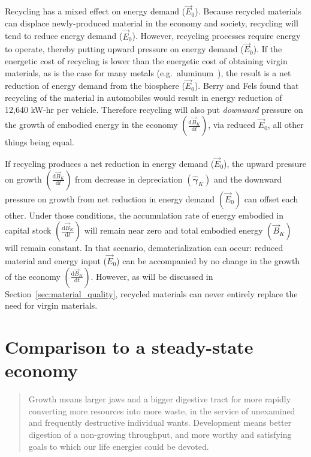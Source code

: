 Recycling has a mixed effect on energy demand ($\vec{E}_{0}$). 
Because recycled materials can displace newly-produced material 
in the economy and society, 
recycling will tend to reduce energy demand ($\vec{E}_{0}$). 
However, recycling processes require energy to operate, 
thereby putting upward pressure on energy demand ($\vec{E}_{0}$). 
If the energetic cost of recycling is lower than 
the energetic cost of obtaining virgin materials, 
as is the case for many metals
(e.g.\ aluminum~\cite{Chapman1975}), 
the result is a net reduction of energy demand 
from the biosphere ($\vec{E}_{0}$). 
Berry and Fels found that recycling of the material in automobiles
would result in energy reduction of 12,640 kW-hr per vehicle.\cite[p.~15]{Berry:1973vo}
Therefore recycling will also put \emph{downward} pressure on 
the growth of embodied energy in the economy
$\left(\frac{\mathrm{d}\vec{B}_{K}}{\mathrm{d}t}\right)$,
via reduced $\vec{E}_{0}$, all other things being equal. 

If recycling produces a net reduction in energy demand ($\vec{E}_{0}$), 
the upward pressure on growth 
$\left(\frac{\mathrm{d}\vec{B}_{K}}{\mathrm{d}t}\right)$ 
from decrease in depreciation 
$\left(\hat{\boldsymbol{\gamma}}_{K}\right)$ 
and the downward pressure on growth 
from net reduction in energy demand 
$\left(\vec{E}_{0}\right)$ 
can offset each other.
Under those conditions, 
the accumulation rate of energy embodied in capital stock
$\left(\frac{\mathrm{d}\vec{B}_{K}}{\mathrm{d}t}\right)$ 
will remain near zero 
and total embodied energy 
$(\vec{B}_{K})$ will remain constant. 
In that scenario, 
dematerialization can occur: 
reduced material and energy input ($\vec{E}_{0}$) 
can be accompanied by 
no change in
the growth of the economy
$\left(\frac{\mathrm{d}\vec{B}_{K}}{\mathrm{d}t}\right)$.
However,
as will be discussed in Section~\ref{sec:material_quality},
recycled materials can never entirely replace
the need for virgin materials.


\section{Comparison to a steady-state economy}
\label{sec:SSE}

\begin{quotation}
	Growth means larger jaws and a bigger digestive tract 
	for more rapidly converting more resources into more waste, 
	in the service of unexamined and frequently destructive 
	individual wants.
	Development means better digestion of a non-growing throughput, 
	and more worthy and satisfying goals to which our life energies could be devoted.~\cite{Daly2012}
\end{quotation}

